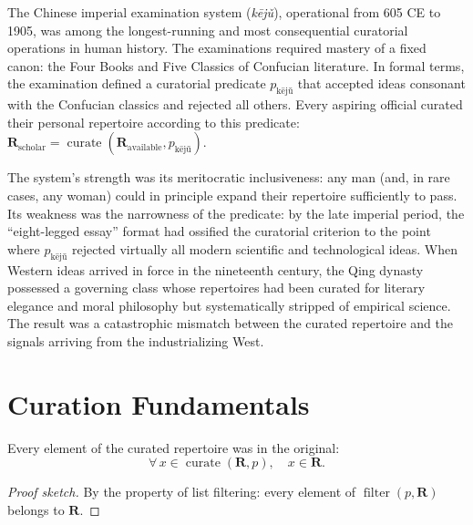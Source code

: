 \begin{example}
\label{ex:keju}
The Chinese imperial examination system (\textit{k\={e}j\v{u}}),
operational from 605 CE to 1905, was among the longest-running and most
consequential curatorial operations in human history.  The examinations
required mastery of a fixed canon: the Four Books and Five Classics of
Confucian literature.  In formal terms, the examination defined a
curatorial predicate $p_{\text{k\={e}j\v{u}}}$ that accepted ideas
consonant with the Confucian classics and rejected all others.  Every
aspiring official curated their personal repertoire according to this
predicate: $\mathbf{R}_{\text{scholar}} = \operatorname{curate}(
\mathbf{R}_{\text{available}}, p_{\text{k\={e}j\v{u}}})$.

The system's strength was its meritocratic inclusiveness: any man
(and, in rare cases, any woman) could in principle expand their
repertoire sufficiently to pass.  Its weakness was the narrowness of the
predicate: by the late imperial period, the ``eight-legged essay''
format had ossified the curatorial criterion to the point where
$p_{\text{k\={e}j\v{u}}}$ rejected virtually all modern scientific and
technological ideas.  When Western ideas arrived in force in the
nineteenth century, the Qing dynasty possessed a governing class whose
repertoires had been curated for literary elegance and moral philosophy
but systematically stripped of empirical science.  The result was a
catastrophic mismatch between the curated repertoire and the signals
arriving from the industrializing West.
\end{example}

\section{Curation Fundamentals}
\label{sec:ch15-curation}

\begin{theorem}
\label{thm:curate-subset}
Every element of the curated repertoire was in the original:
\[
  \forall\, x \in \operatorname{curate}(\mathbf{R}, p),\quad x \in \mathbf{R}.
\]
\end{theorem}

\begin{proof}[Proof sketch]
By the property of list filtering: every element of
$\operatorname{filter}(p, \mathbf{R})$ belongs to $\mathbf{R}$.
\end{proof}

